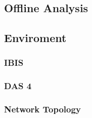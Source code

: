 \subsection{Offline Analysis}

\subsection{Enviroment}
\subsubsection{IBIS}
\subsubsection{DAS 4}
\subsubsection{Network Topology}